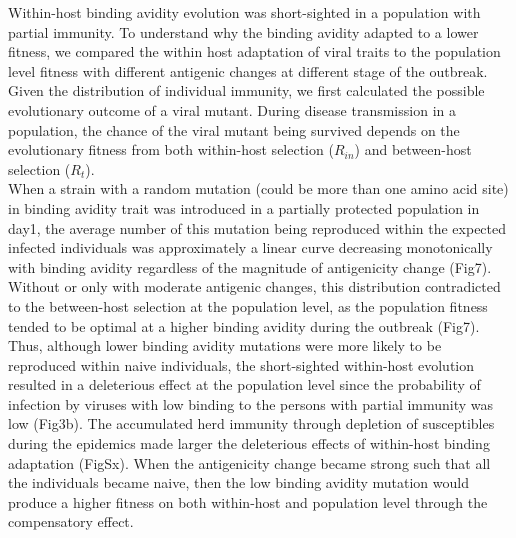 \documentclass[12pt,a4paper]{article}
\begin{document}
Within-host binding avidity evolution was short-sighted in a population with partial immunity. To understand why the binding avidity adapted to a lower fitness, we compared the within host adaptation of viral traits to the population level fitness with different antigenic changes at different stage of the outbreak. Given the distribution of individual immunity, we first calculated the possible evolutionary outcome of a viral mutant. During disease transmission in a population, the chance of the viral mutant being survived depends on the evolutionary fitness from both within-host selection ($R_{in}$) and between-host selection ($R_{t}$). \\
When a strain with a random mutation (could be more than one amino acid site) in binding avidity trait was introduced in a partially protected population in day1, the average number of this mutation being reproduced within the expected infected individuals was approximately a linear curve decreasing monotonically with binding avidity regardless of the magnitude of antigenicity change (Fig7). Without or only with moderate antigenic changes, this distribution contradicted to the between-host selection at the population level, as the population fitness tended to be optimal at a higher binding avidity during the outbreak (Fig7). Thus, although lower binding avidity mutations were more likely to be reproduced within naive individuals, the short-sighted within-host evolution resulted in a deleterious effect at the population level since the probability of infection by viruses with low binding to the persons with partial immunity was low (Fig3b). The accumulated herd immunity through depletion of susceptibles during the epidemics made larger the deleterious effects of within-host binding adaptation (FigSx). When the antigenicity change became strong such that all the individuals became naive, then the low binding avidity mutation would produce a higher fitness on both within-host and population level through the compensatory effect. \\
\end{document}
